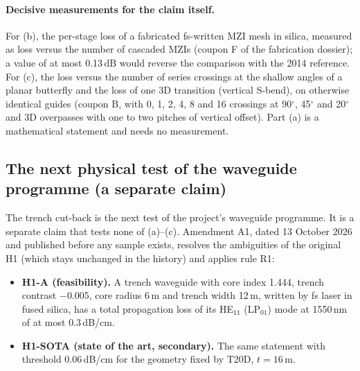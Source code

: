 \documentclass[11pt,a4paper]{article}
\newcommand{\dBcm}{\,dB/cm\xspace}
\newcommand{\um}{\,\textmu m\xspace}
\newcommand{\dB}{\,dB\xspace}
\begin{document}
\paragraph{Decisive measurements for the claim itself.} For (b), the per-stage loss of a fabricated fs-written MZI mesh in silica, measured as loss versus the number of cascaded MZIs (coupon F of the fabrication dossier); a value of at most 0.13\dB would reverse the comparison with the 2014 reference. For (c), the loss versus the number of series crossings at the shallow angles of a planar butterfly and the loss of one 3D transition (vertical S-bend), on otherwise identical guides (coupon B, with 0, 1, 2, 4, 8 and 16 crossings at 90$^\circ$, 45$^\circ$ and 20$^\circ$ and 3D overpasses with one to two pitches of vertical offset). Part (a) is a mathematical statement and needs no measurement.

\subsection{The next physical test of the waveguide programme (a separate claim)}
\label{sec:nexttest}

The trench cut-back is the next test of the project's waveguide programme. It is a separate claim that tests none of (a)--(c). Amendment A1, dated 13 October 2026 and published before any sample exists, resolves the ambiguities of the original H1 (which stays unchanged in the history) and applies rule R1:

\begin{itemize}
\item \textbf{H1-A (feasibility).} A trench waveguide with core index 1.444, trench contrast $-0.005$, core radius 6\um and trench width 12\um, written by fs laser in fused silica, has a total propagation loss of its HE$_{11}$ (LP$_{01}$) mode at 1550\,nm of at most 0.3\dBcm.
\item \textbf{H1-SOTA (state of the art, secondary).} The same statement with threshold 0.06\dBcm for the geometry fixed by T20D, $t=16$\um.
\end{itemize}
\end{document}
